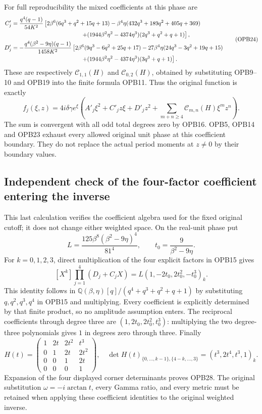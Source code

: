 \documentclass[11pt]{article}
\begin{document}
For full reproducibility the mixed coefficients at this phase are
\[
 \begin{split}
 C'_j&=\frac{q^4(q-1)}{54K^2}\left[
 2\beta^6(6q^3+q^2+15q+13)
 -\beta^4\eta(432q^3+189q^2+405q+369)\right.\\
 &\hspace{42mm}\left.
 +(1944\beta^2\eta^2-4374\eta^3)(2q^3+q^2+q+1)\right],\\
 D'_j&=-\frac{q^4(\beta^2-9\eta)(q-1)}{1458K^2}\left[
 2\beta^6(9q^3-6q^2+25q+17)
 -27\beta^4\eta(24q^3-3q^2+19q+15)\right.\\
 &\hspace{42mm}\left.
 +(1944\beta^2\eta^2-4374\eta^3)(3q^3+q+1)\right].
 \end{split}\tag{OPB24}
\]
These are respectively $\mathcal C_{1,1}(H)$ and
$\mathcal C_{0,2}(H)$, obtained by substituting OPB9--10 and OPB19
into the finite formula OPB11. Thus the original function is exactly
\[
 f_j(\xi,z)=4i\delta\gamma e^\xi
 \left(A'_j\xi^2+C'_jz\xi+D'_jz^2+
       \sum_{m+n\ge4}\mathcal C_{m,n}(H)\xi^mz^n\right).
 \tag{OPB25}
\]
The sum is convergent with all odd total degrees zero by OPB16.
OPB5, OPB14 and OPB23 exhaust every allowed original unit phase at
this coefficient boundary. They do not replace the actual period
moments at $z\ne0$ by their boundary values.

\subsection{Independent check of the four-factor coefficient entering the inverse}
This last calculation verifies the coefficient algebra used for the
fixed original cutoff; it does not change either weighted space.
On the real-unit phase put
\[
 L=\frac{125\beta^8(\beta^2-9\eta)^4}{81^4},\qquad
 t_0=\frac9{\beta^2-9\eta}.
 \tag{OPB26}
\]
For $k=0,1,2,3$, direct multiplication of the four explicit factors
in OPB15 gives
\[
 [X^k]\prod_{j=1}^4(D_j+C_jX)
       =L(1,-2t_0,2t_0^2,-t_0^3)_k.
 \tag{OPB27}
\]
This identity follows in $\mathbb Q(\beta,\eta)[q]/
(q^4+q^3+q^2+q+1)$ by substituting $q,q^2,q^3,q^4$ in
OPB15 and multiplying. Every coefficient is explicitly determined
by that finite product, so no amplitude assumption enters.
The reciprocal coefficients through degree three are
$(1,2t_0,2t_0^2,t_0^3)$: multiplying the two degree-three
polynomials gives $1$ in degrees zero through three. Finally
\[
 H(t)=\begin{pmatrix}
 1&2t&2t^2&t^3\\0&1&2t&2t^2\\0&0&1&2t\\0&0&0&1
 \end{pmatrix},\quad
 \det H(t)_{\{0,\ldots,k-1\},\{4-k,\ldots,3\}}
       =(t^3,2t^4,t^3,1)_k.
 \tag{OPB28}
\]
Expansion of the four displayed corner determinants proves OPB28.
The original substitution $\omega=-i\arctan t$, every Gamma ratio,
and every metric must be retained when applying these coefficient
identities to the original weighted inverse.
\end{document}

